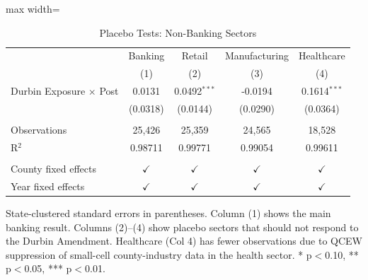 
\begin{table}[htbp]
   \caption{\label{tab:placebo} Placebo Tests: Non-Banking Sectors}
   \bigskip
   \centering
   \begin{adjustbox}{max width=\textwidth}
   \begin{tabular}{lcccc}
      \toprule
                                  & Banking          & Retail              & Manufacturing    & Healthcare \\
                                  & (1)              & (2)                 & (3)              & (4)\\
      \midrule
      Durbin Exposure $\times$ Post & 0.0131           & 0.0492$^{***}$      & -0.0194          & 0.1614$^{***}$\\
                                  & (0.0318)         & (0.0144)            & (0.0290)         & (0.0364)\\
       \\
      Observations                & 25,426           & 25,359              & 24,565           & 18,528\\
      R$^2$                       & 0.98711          & 0.99771             & 0.99054          & 0.99611\\
       \\
      County fixed effects        & $\checkmark$     & $\checkmark$        & $\checkmark$     & $\checkmark$\\
      Year fixed effects          & $\checkmark$     & $\checkmark$        & $\checkmark$     & $\checkmark$\\
      \bottomrule
   \end{tabular}
   \end{adjustbox}
   
   \par \raggedright 
   State-clustered standard errors in parentheses. Column (1) shows the main banking result. Columns (2)--(4) show placebo sectors that should not respond to the Durbin Amendment. Healthcare (Col 4) has fewer observations due to QCEW suppression of small-cell county-industry data in the health sector. * p$<$0.10, ** p$<$0.05, *** p$<$0.01.
\end{table}


